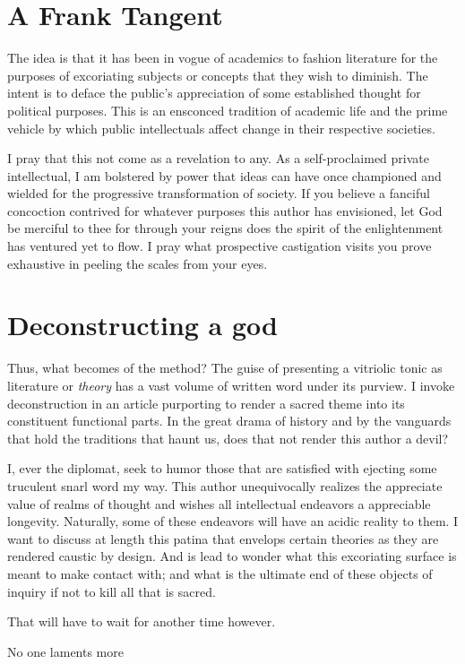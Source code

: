 \documentclass[ms,a4paper]{memoir}
\newcommand{\red}[1]{\textcolor{red!50!black}{#1}}
\begin{document}
	\section{\red{A Frank Tangent}}
	The idea is that it has been in vogue of academics to fashion literature for the purposes of excoriating subjects or concepts that they wish to diminish. The intent is to deface the public's appreciation of some established thought for political purposes. This is an ensconced tradition of academic life and the prime vehicle by which public intellectuals affect change in their respective societies.
	
	I pray that this not come as a revelation to any. As a self-proclaimed private intellectual, I am bolstered by power that ideas can have once championed and wielded for the progressive transformation of society. If you believe a fanciful concoction contrived for whatever purposes this author has envisioned, let God be merciful to thee for through your reigns does the spirit of the enlightenment has ventured yet to flow. I pray what prospective castigation visits you prove exhaustive in peeling the scales from your eyes.
	
	\section{\red{Deconstructing a god}}
	Thus, what becomes of the method? The guise of presenting a vitriolic tonic as literature or \textit{theory} has a vast volume of written word under its purview. I invoke deconstruction in an article purporting to render a sacred theme into its constituent functional parts. In the great drama of history and by the vanguards that hold the traditions that haunt us, does that not render this author a devil?
	
	I, ever the diplomat, seek to humor those that are satisfied with ejecting some truculent snarl word my way. This author unequivocally realizes the appreciate value of realms of thought and wishes all intellectual endeavors a appreciable longevity. Naturally, some of these endeavors will have an acidic reality to them. I want to discuss at length this patina that envelops certain theories as they are rendered caustic by design. And is lead to wonder what this excoriating surface is meant to make contact with; and what is the ultimate end of these objects of inquiry if not to kill all that is sacred.
	
	That will have to wait for another time however.
	
	No one laments more
	
\end{document}
